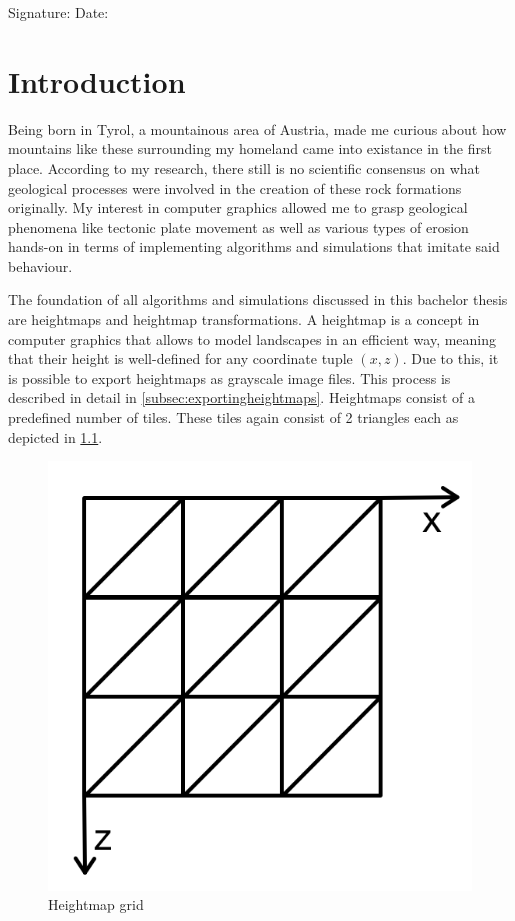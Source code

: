 \documentclass[11pt,a4paper,twoside,openright]{report}
\begin{document}
\vspace{15mm}

\noindent Signature: \underline{\hspace{5cm}} \hspace{1cm}  Date: \underline{\hspace{5cm}}


\chapter{Introduction}
\label{sec:intro}

\pagestyle{fancy}

Being born in Tyrol, a mountainous area of Austria, made me curious about how mountains like these surrounding my homeland came into existance in the first place. According to my research, there still is no scientific consensus on what geological processes were involved in the creation of these rock formations originally. My interest in computer graphics allowed me to grasp geological phenomena like tectonic plate movement as well as various types of erosion hands-on in terms of implementing algorithms and simulations that imitate said behaviour.

The foundation of all algorithms and simulations discussed in this bachelor thesis are heightmaps and heightmap transformations. A heightmap is a concept in computer graphics that allows to model landscapes in an efficient way, meaning that their height is well-defined for any coordinate tuple $(x,z)$. Due to this, it is possible to export heightmaps as grayscale image files. This process is described in detail in \cref{subsec:exportingheightmaps}. Heightmaps consist of a predefined number of tiles. These tiles again consist of 2 triangles each as depicted in \cref{fig:heightmapgrid}.

\begin{figure}[h]
\centering
\includegraphics[width=0.25\linewidth]{heightmapgrid.png}
\caption{Heightmap grid}\label{fig:heightmapgrid}
\end{figure}
\end{document}
